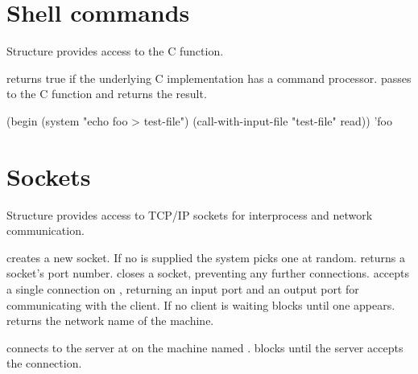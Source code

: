 \section{Shell commands}

Structure  provides access to the C 
 function.

\begin{protos}
\end{protos}
\noindent
{} returns true if the underlying C implementation
 has a command processor.
 passes  to the C
  function and returns the result.

\begin{example}
(begin
  (system "echo foo > test-file")
  (call-with-input-file "test-file" read))
\evalsto 'foo
\end{example}

\section{Sockets}

Structure  provides access to TCP/IP sockets for interprocess
 and network communication.

\begin{protos}
\end{protos}
\noindent
{} creates a new socket.
If no  is supplied the system picks one at random.
 returns a socket's port number.
 closes a socket, preventing any further connections.
 accepts a single connection on , returning
 an input port and an output port for communicating with the client.
If no client is waiting  blocks until one appears.
 returns the network name of the machine.

\begin{protos}
\end{protos}
\noindent
{} connects to the server at  on
 the machine named .
 blocks until the server accepts the connection.

